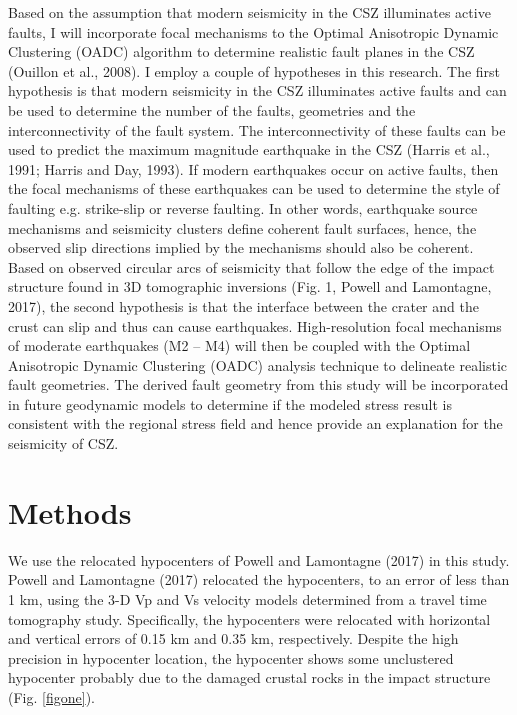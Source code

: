 \documentclass[draft]{agujournal2018}
\begin{document}
Based on the assumption that modern seismicity in the CSZ illuminates active faults, I will incorporate focal mechanisms to the Optimal Anisotropic Dynamic Clustering (OADC) algorithm to determine realistic fault planes in the CSZ (Ouillon et al., 2008). I employ a couple of hypotheses in this research. The first hypothesis is that modern seismicity in the CSZ illuminates active faults and can be used to determine the number of the faults, geometries and the interconnectivity of the fault system. The interconnectivity of these faults can be used to predict the maximum magnitude earthquake in the CSZ (Harris et al., 1991; Harris and Day, 1993). If modern earthquakes occur on active faults, then the focal mechanisms of these earthquakes can be used to determine the style of faulting e.g. strike-slip or reverse faulting. In other words, earthquake source mechanisms and seismicity clusters define coherent fault surfaces, hence, the observed slip directions implied by the mechanisms should also be coherent. Based on observed circular arcs of seismicity that follow the edge of the impact structure found in 3D tomographic inversions (Fig. 1, Powell and Lamontagne, 2017), the second hypothesis is that the interface between the crater and the crust can slip and thus can cause earthquakes. High-resolution focal mechanisms of moderate earthquakes (M2 – M4) will then be coupled with the Optimal Anisotropic Dynamic Clustering (OADC) analysis technique to delineate realistic fault geometries. The derived fault geometry from this study will be incorporated in future geodynamic models to determine if the modeled stress result is consistent with the regional stress field and hence provide an explanation for the seismicity of CSZ.



    

 
 
 
 
 
 
 
 
    
\section{Methods}
We use the relocated hypocenters of Powell and Lamontagne (2017) in this study. Powell and Lamontagne (2017) relocated the hypocenters, to an error of less than 1 km, using the 3-D Vp and Vs velocity models determined from a travel time tomography study. Specifically, the hypocenters were relocated with horizontal and vertical errors of 0.15 km and 0.35 km, respectively. Despite the high precision in hypocenter location, the hypocenter shows some unclustered hypocenter probably due to the damaged crustal rocks in the impact structure (Fig. \ref{figone}).
\end{document}
